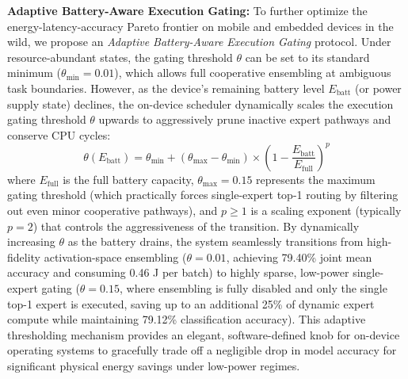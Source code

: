 \textbf{Adaptive Battery-Aware Execution Gating:} To further optimize the energy-latency-accuracy Pareto frontier on mobile and embedded devices in the wild, we propose an \textit{Adaptive Battery-Aware Execution Gating} protocol. Under resource-abundant states, the gating threshold $\theta$ can be set to its standard minimum ($\theta_{\text{min}} = 0.01$), which allows full cooperative ensembling at ambiguous task boundaries. However, as the device's remaining battery level $E_{\text{batt}}$ (or power supply state) declines, the on-device scheduler dynamically scales the execution gating threshold $\theta$ upwards to aggressively prune inactive expert pathways and conserve CPU cycles:
\begin{equation}
  \theta(E_{\text{batt}}) = \theta_{\text{min}} + \left(\theta_{\text{max}} - \theta_{\text{min}}\right) \times \left(1 - \frac{E_{\text{batt}}}{E_{\text{full}}}\right)^p
\end{equation}
where $E_{\text{full}}$ is the full battery capacity, $\theta_{\text{max}} = 0.15$ represents the maximum gating threshold (which practically forces single-expert top-1 routing by filtering out even minor cooperative pathways), and $p \ge 1$ is a scaling exponent (typically $p=2$) that controls the aggressiveness of the transition. By dynamically increasing $\theta$ as the battery drains, the system seamlessly transitions from high-fidelity activation-space ensembling ($\theta = 0.01$, achieving 79.40\% joint mean accuracy and consuming 0.46 J per batch) to highly sparse, low-power single-expert gating ($\theta = 0.15$, where ensembling is fully disabled and only the single top-1 expert is executed, saving up to an additional 25\% of dynamic expert compute while maintaining 79.12\% classification accuracy). This adaptive thresholding mechanism provides an elegant, software-defined knob for on-device operating systems to gracefully trade off a negligible drop in model accuracy for significant physical energy savings under low-power regimes.
